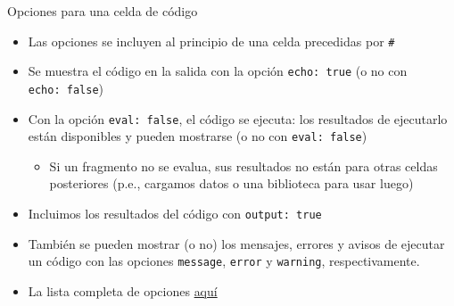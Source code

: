 \documentclass[
  10pt,
  ignorenonframetext,
]{beamer}
\providecommand{\tightlist}{%
  \setlength{\itemsep}{0pt}\setlength{\parskip}{0pt}}\usepackage{longtable,booktabs,array}
\begin{document}
\begin{frame}[fragile]{Opciones para una celda de código}
\label{opciones-para-una-celda-de-cuxf3digo}
\begin{itemize}
\item
  Las opciones se incluyen al principio de una celda precedidas por
  \texttt{\#\textbar{}}
\item
  Se muestra el código en la salida con la opción \texttt{echo:\ true}
  (o no con \texttt{echo:\ false})
\item
  Con la opción \texttt{eval:\ false}, el código se ejecuta: los
  resultados de ejecutarlo están disponibles y pueden mostrarse (o no
  con \texttt{eval:\ false})

  \begin{itemize}
  \tightlist
  \item
    Si un fragmento no se evalua, sus resultados no están para otras
    celdas posteriores (p.e., cargamos datos o una biblioteca para usar
    luego)
  \end{itemize}
\item
  Incluimos los resultados del código con \texttt{output:\ true}
\end{itemize}

\begin{itemize}
\item
  También se pueden mostrar (o no) los mensajes, errores y avisos de
  ejecutar un código con las opciones \texttt{message}, \texttt{error} y
  \texttt{warning}, respectivamente.
\item
  La lista completa de opciones
  \href{http://yihui.name/knitr/options/}{aquí}
\end{itemize}
\end{frame}
\end{document}

